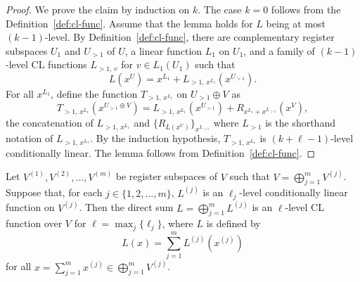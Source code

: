 \begin{proof}
  We prove the claim by induction on $k$.
  The case $k = 0$ follows from the Definition~\ref{def:cl-func}.
  Assume that the lemma holds for $L$ being at most $(k-1)$-level.
  By Definition~\ref{def:cl-func}, there are complementary register subspaces
  $U_1$ and $U_{>1}$ of $U$, a linear function $L_1$ on $U_1$, and a family of
  $(k-1)$-level CL functions $L_{>1,\, v}$ for $v \in L_1(U_1)$ such that
  \begin{equation*}
    L(x^U) = x^{L_1} + L_{>1,\, x^{L_1}}(x^{U_{>1}}).
  \end{equation*}
  For all $x^{L_1}$, define the function $T_{>1,\, x^{L_1}}$ on $U_{>1} \oplus V$ as
  \begin{equation*}
    T_{>1,\, x^{L_1}}(x^{U_{>1} \oplus V}) = L_{>1,\, x^{L_1}}(x^{U_{>1}}) +
    R_{x^{L_1} + x^{L_{>1}}}(x^V),
  \end{equation*}
  the concatenation of $L_{>1,\, x^{L_1}}$ and $\{ R_{L(x^U)} \}_{x^{L_{>1}}}$
  where $L_{>1}$ is the shorthand notation of $L_{>1,\, x^{L_1}}$.
  By the induction hypothesis, $T_{>1,\, x^{L_1}}$ is $(k+\ell-1)$-level
  conditionally linear.
  The lemma follows from Definition~\ref{def:cl-func}.
\end{proof}
\begin{lemma}
  \label{lem:cl-func-prod}
  Let $V^{(1)}, V^{(2)}, \ldots, V^{(m)}$ be register subspaces of $V$ such that
  $V = \bigoplus_{j=1}^m V^{(j)}$.
  Suppose that, for each $j\in\{1, 2, \ldots, m\}$, $L^{(j)}$ is an
  $\ell_j$-level conditionally linear function on $V^{(j)}$.
  Then the direct sum $L = \bigoplus_{j=1}^m L^{(j)}$ is an $\ell$-level CL
  function over $V$ for $\ell = \max_j \{\ell_j\}$, where $L$ is defined by
  \begin{equation*}
    L(x) = \sum_{j=1}^m  L^{(j)}(x^{(j)})
  \end{equation*}
  for all $x = \sum_{j=1}^m x^{(j)} \in \bigoplus_{j=1}^m V^{(j)}$.
\end{lemma}

